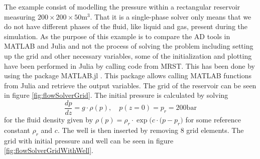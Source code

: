The example consist of modelling the pressure within a rectangular reservoir measuring $200\times 200 \times 50 \text{m}^3$. That it is a single-phase solver only means that we do not have different phases of the fluid, like liquid and gas, present during the simulation. As the purpose of this example is to compare the AD tools in MATLAB and Julia and not the process of solving the problem including setting up the grid and other necessary variables, some of the initialization and plotting have been performed in Julia by calling code from MRST. This has been done by using the package MATLAB.jl \emph{\citep{MATLAB.jl}}. This package allows calling MATLAB functions from Julia and retrieve the output variables. The grid of the reservoir can be seen in figure \ref{fig:flowSolverGrid}. The initial pressure is calculated by solving
\begin{equation*}
    \frac{dp}{dz} = g\cdot \rho(p), \quad p(z = 0) = p_r = 200\text{bar} 
\end{equation*}
for the fluid density given by $\rho(p) = \rho_r\cdot\exp\big(c\cdot(p-p_r\big)$ for some reference constant $\rho_r$ and $c$. The well is then inserted by removing 8 grid elements. The grid with initial pressure and well can be seen in figure \ref{fig:flowSolverGridWithWell}.
